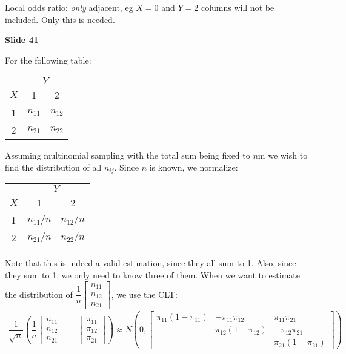 \noindent Local odds ratio: \textit{only} adjacent, eg $X = 0$ and $Y = 2$ columns will not be included. Only this is needed.
\par\bigskip
\noindent\textbf{Slide 41}\par
\noindent For the following table:
\begin{center}
  \begin{tabular}{ccc}
    &\multicolumn{2}{c}{$Y$}\\
    \cmidrule{2-3}
    $X$&1&2\\
    \midrule
    1&$n_{11}$&$n_{12}$\\
    2&$n_{21}$&$n_{22}$
  \end{tabular}
\end{center}\par
\noindent Assuming multinomial sampling with the total sum being fixed to $n$m we wish to find the distribution of all $n_{ij}$. Since $n$ is known, we normalize:\par
\begin{center}
  \begin{tabular}{ccc}
    &\multicolumn{2}{c}{$Y$}\\
    \cmidrule{2-3}
    $X$&1&2\\
    \midrule
    1&$n_{11}/n$&$n_{12}/n$\\
    2&$n_{21}/n$&$n_{22}/n$
  \end{tabular}
\end{center}\par
\noindent Note that this is indeed a valid estimation, since they all sum to 1. Also, since they sum to 1, we only need to know three of them. When we want to estimate the distribution of $\dfrac{1}{n}\begin{bmatrix}n_{11}\\n_{12}\\n_{21}\end{bmatrix}$, we use the CLT:
\begin{equation*}
  \begin{gathered}
    \dfrac{1}{\sqrt{n}}\left(\dfrac{1}{n}\begin{bmatrix}n_{11}\\n_{12}\\n_{21}\end{bmatrix}-\begin{bmatrix}\pi_{11}\\\pi_{12}\\\pi_{21}\end{bmatrix}\right)\approx N\left(0,\begin{bmatrix}\pi_{11}(1-\pi_{11})&-\pi_{11}\pi_{12}&\pi_{11}\pi_{21}\\&\pi_{12}(1-\pi_{12})&-\pi_{12}\pi_{21}\\&&\pi_{21}(1-\pi_{21})\end{bmatrix}\right)
  \end{gathered}
\end{equation*}
